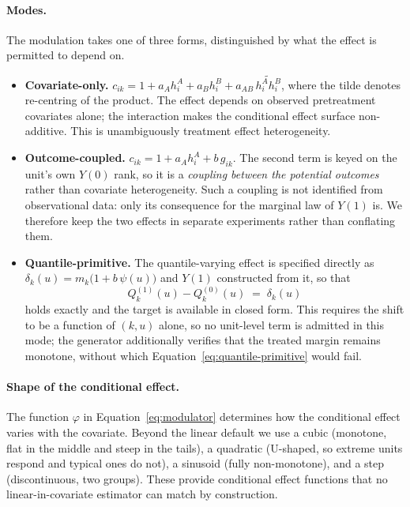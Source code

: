 \paragraph{Modes.} The modulation takes one of three forms, distinguished by what the effect is
permitted to depend on.
\begin{itemize}
    \item \textbf{Covariate-only.}
    $c_{ik} = 1 + a_A h^{A}_i + a_B h^{B}_i + a_{AB}\,\widetilde{h^{A}_i h^{B}_i}$,
    where the tilde denotes re-centring of the product. The effect depends on observed
    pretreatment covariates alone; the interaction makes the conditional effect surface
    non-additive. This is unambiguously treatment effect heterogeneity.

    \item \textbf{Outcome-coupled.} $c_{ik} = 1 + a_A h^{A}_i + b\, g_{ik}$. The second term is
    keyed on the unit's own $Y(0)$ rank, so it is a \emph{coupling between the potential
    outcomes} rather than covariate heterogeneity. Such a coupling is not identified from
    observational data: only its consequence for the marginal law of $Y(1)$ is. We therefore
    keep the two effects in separate experiments rather than conflating them.

    \item \textbf{Quantile-primitive.} The quantile-varying effect is specified directly as
    $\delta_k(u) = m_k\big(1 + b\,\psi(u)\big)$ and $Y(1)$ constructed from it, so that
    \begin{equation}
        Q^{(1)}_k(u) - Q^{(0)}_k(u) \;=\; \delta_k(u)
        \label{eq:quantile-primitive}
    \end{equation}
    holds exactly and the target is available in closed form. This requires the shift to be a
    function of $(k, u)$ alone, so no unit-level term is admitted in this mode; the generator
    additionally verifies that the treated margin remains monotone, without which
    Equation~\eqref{eq:quantile-primitive} would fail.
\end{itemize}

\paragraph{Shape of the conditional effect.} The function $\varphi$ in
Equation~\eqref{eq:modulator} determines how the conditional effect varies with the covariate.
Beyond the linear default we use a cubic (monotone, flat in the middle and steep in the
tails), a quadratic (U-shaped, so extreme units respond and typical ones do not), a sinusoid
(fully non-monotone), and a step (discontinuous, two groups). These provide conditional effect
functions that no linear-in-covariate estimator can match by construction.

